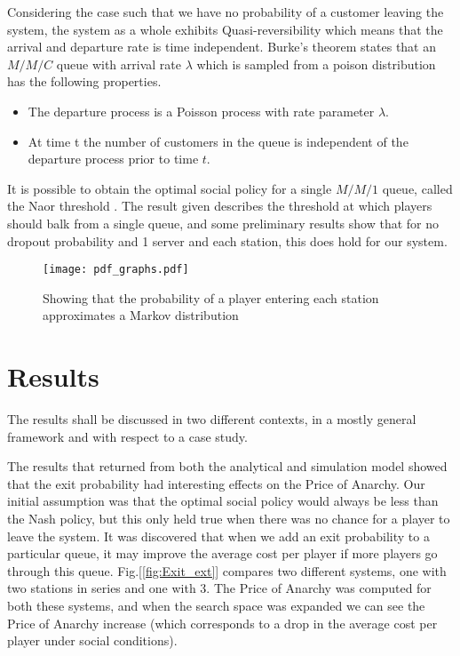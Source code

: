 \documentclass[12pt]{article}
\begin{document}
Considering the case such that we have no probability of a customer leaving the system, the system as a whole exhibits Quasi-reversibility\cite{cite018} which means that the arrival and departure rate is time independent. Burke's theorem \cite{cite025} states that an $M/M/C$ queue with arrival rate $\lambda$ which is sampled from a poison distribution has the following properties.

\begin{itemize}
    	\item{The departure process is a Poisson process with rate parameter $\lambda$. }
        \item{At time t the number of customers in the queue is independent of the departure process prior to time $t$.}
    \end{itemize}

It is possible to obtain the optimal social policy for a single $M/M/1$ queue, called the Naor threshold \cite{cite026}. The result given describes the threshold at which players should balk from a single queue, and some preliminary results show that for no dropout probability and 1 server and each station, this does hold for our system.

\begin{figure}[ht]
    \begin{center}

		\texttt{[image: pdf\_graphs.pdf]}
		\caption{Showing that the probability of a player entering each station approximates a Markov distribution }
		\label{fig:Markovian}
    \end{center}
\end{figure}


\section{Results}
	The results shall be discussed in two different contexts, in a mostly general framework and with respect to a case study.


	The results that returned from both the analytical and simulation model showed that the exit probability had interesting effects on the Price of Anarchy. Our initial assumption was that the optimal social policy would always be less than the Nash policy, but this only held true when there was no chance for a player to leave the system. It was discovered that when we add an exit probability to a particular queue, it may improve the average cost per player if more players go through this queue. Fig.[\ref{fig:Exit_ext}] compares two different systems, one with two stations in series and one with 3. The Price of Anarchy was computed for both these systems, and when the search space was expanded we can see the Price of Anarchy increase (which corresponds to a drop in the average cost per player under social conditions).
\end{document}
